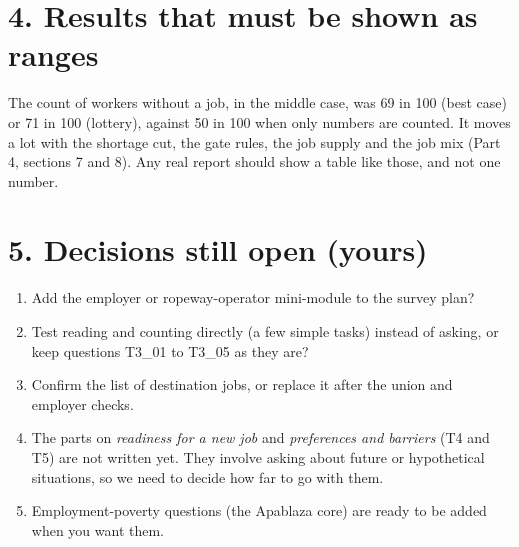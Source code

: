 \documentclass[11pt]{article}
\begin{document}
\section*{4. Results that must be shown as ranges}
The count of workers without a job, in the middle case, was 69 in 100 (best case) or 71 in 100 (lottery), against 50 in 100 when only numbers are counted.
It moves a lot with the shortage cut, the gate rules, the job supply and the job mix (Part 4, sections 7 and 8).
Any real report should show a table like those, and not one number.

\section*{5. Decisions still open (yours)}
\begin{enumerate}[leftmargin=1.4em,itemsep=2pt]
\item Add the employer or ropeway-operator mini-module to the survey plan?
\item Test reading and counting directly (a few simple tasks) instead of asking, or keep questions T3\_01 to T3\_05 as they are?
\item Confirm the list of destination jobs, or replace it after the union and employer checks.
\item The parts on \emph{readiness for a new job} and \emph{preferences and barriers} (T4 and T5) are not written yet. They involve asking about future or hypothetical situations, so we need to decide how far to go with them.
\item Employment-poverty questions (the Apablaza core) are ready to be added when you want them.
\end{enumerate}
\end{document}
